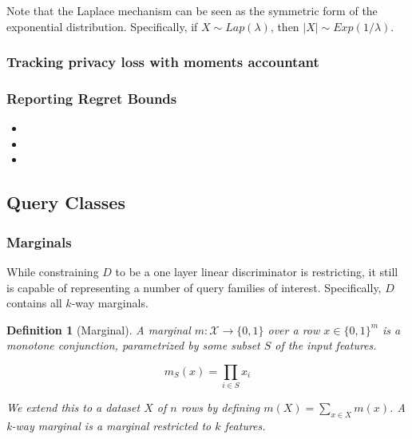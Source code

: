 \documentclass[]{article}
\newcommand{\X}{\mathcal{X}}
\newcommand{\B}{\{0,1\}}
\newtheorem{definition}{Definition}[section]
\theoremstyle{definition}
\begin{document}
Note that the Laplace mechanism can be seen as the symmetric form of the exponential distribution. Specifically, if $X \sim Lap(\lambda)$, then $|X| \sim Exp(1/\lambda)$. 


\subsubsection{Tracking privacy loss with moments accountant}

\subsubsection{Reporting Regret Bounds}
\begin{itemize}
    \item {}
    \item {}
    \item {}
\end{itemize}

\subsection{Query Classes}
\subsubsection{Marginals}

While constraining $D$ to be a one layer linear discriminator is restricting, it still is capable of representing a number of query families of interest. Specifically, $D$ contains all $k$-way marginals.

\begin{definition}[Marginal]
    A marginal $m: \X \to \B$ over a row $x \in \{0,1\}^m$ is a monotone conjunction, parametrized by some subset $S$ of the input features.  

    \begin{equation}
        m_S(x) = \prod_{i \in S} x_i
    \end{equation}
    
    We extend this to a dataset $X$ of $n$ rows by defining $m(X) = \sum_{x \in X} m(x)$. A k-way marginal is a marginal restricted to $k$ features.
\end{definition} \cite{DR13}
\end{document}
